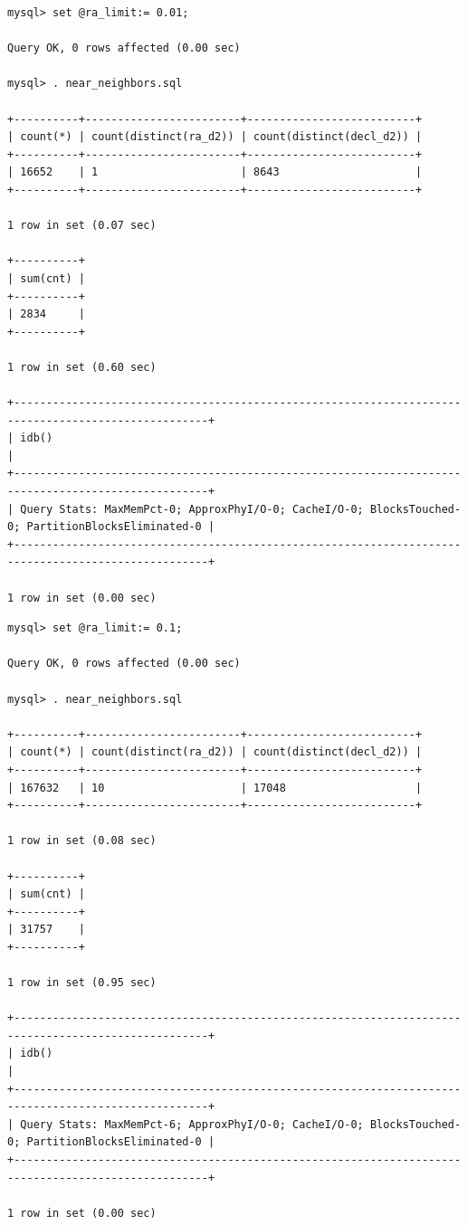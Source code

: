 \documentclass[DM,lsstdraft,toc]{lsstdoc}
\begin{document}
\begin{verbatim}
mysql> set @ra_limit:= 0.01;

Query OK, 0 rows affected (0.00 sec)

mysql> . near_neighbors.sql

+----------+------------------------+--------------------------+
| count(*) | count(distinct(ra_d2)) | count(distinct(decl_d2)) |
+----------+------------------------+--------------------------+
| 16652    | 1                      | 8643                     |
+----------+------------------------+--------------------------+

1 row in set (0.07 sec)

+----------+
| sum(cnt) |
+----------+
| 2834     |
+----------+

1 row in set (0.60 sec)

+----------------------------------------------------------------------------------------------------+
| idb()                                                                                              |
+----------------------------------------------------------------------------------------------------+
| Query Stats: MaxMemPct-0; ApproxPhyI/O-0; CacheI/O-0; BlocksTouched-0; PartitionBlocksEliminated-0 |
+----------------------------------------------------------------------------------------------------+

1 row in set (0.00 sec)
\end{verbatim}

\begin{verbatim}
mysql> set @ra_limit:= 0.1;

Query OK, 0 rows affected (0.00 sec)

mysql> . near_neighbors.sql

+----------+------------------------+--------------------------+
| count(*) | count(distinct(ra_d2)) | count(distinct(decl_d2)) |
+----------+------------------------+--------------------------+
| 167632   | 10                     | 17048                    |
+----------+------------------------+--------------------------+

1 row in set (0.08 sec)

+----------+
| sum(cnt) |
+----------+
| 31757    |
+----------+

1 row in set (0.95 sec)

+----------------------------------------------------------------------------------------------------+
| idb()                                                                                              |
+----------------------------------------------------------------------------------------------------+
| Query Stats: MaxMemPct-6; ApproxPhyI/O-0; CacheI/O-0; BlocksTouched-0; PartitionBlocksEliminated-0 |
+----------------------------------------------------------------------------------------------------+

1 row in set (0.00 sec)
\end{verbatim}
\end{document}
